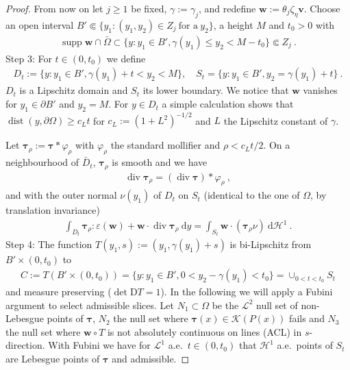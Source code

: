 \documentclass[10pt,a4paper]{amsart}
\newcommand{\K}{\mathcal{K}}
\newcommand{\bftau}{\boldsymbol{\tau}}
\newcommand{\bfv}{\boldsymbol{v}}
\newcommand{\bfw}{\boldsymbol{w}}
\newcommand{\dd}{\:\mathrm{d}}
\DeclareMathOperator{\dist}{dist}
\renewcommand\div{\operatorname{\mathrm{div}}}
\DeclareMathOperator{\supp}{supp}
\begin{document}
\begin{proof}
    From now on let $j\geq 1$ be fixed, $\gamma:= \gamma_j$, and redefine $\bfw:= \theta_j\zeta_\eta\bfv$. Choose an open interval $B' \Subset \{y_1:(y_1,y_2)\in Z_j\ \text{for a}\ y_2\}$, a height $M$ and $t_0>0$ with
    \begin{align*}
        \supp \bfw \cap \bar\Omega \subset \{y : y_1\in B', \gamma(y_1)\leq y_2 < M-t_0\} \Subset Z_j \ .
    \end{align*}
    Step 3: For $t \in (0,t_0)$ we define
    \begin{align*}
        D_t := \{y : y_1\in B', \gamma(y_1)+t <y_2<M\}, \quad S_t =\{y : y_1\in B', y_2 = \gamma(y_1)+t\} \ .
    \end{align*}
    $D_t$ is a Lipschitz domain and $S_t$ its lower boundary. We notice that $\bfw$ vanishes for $y_1\in\partial B'$ and $y_2=M$. For $y\in D_t$ a simple calculation shows that $\dist(y,\partial\Omega)\geq c_L t$ for $c_L := (1+L^2)^{-1/2}$ and
    $L$ the Lipschitz constant of $\gamma$.

    Let $\bftau_\rho := \bftau * \varphi_\rho$ with $\varphi_\rho$ the standard mollifier and $\rho < c_L t/2$. On a neighbourhood of $\bar D_t$, $\bftau_\rho$ is
    smooth and we have
     \begin{align*}
        \div \bftau_\rho = (\div\bftau) * \varphi_\rho \ ,
     \end{align*}
     and with the outer normal $\nu(y_1)$ of $D_t$ on $S_t$ (identical to the one of $\Omega$, by
     translation invariance)
     \begin{align}
        \int_{D_t} \bftau_\rho : \varepsilon(\bfw) + \bfw \cdot \div\bftau_\rho \dd y =
        \int_{S_t} \bfw \cdot(\bftau_\rho \nu) \dd \mathcal{H}^1 \ . \label{eq:trans}
     \end{align}
     Step 4:
     The function $T(y_1, s):= (y_1, \gamma(y_1)+s)$ is bi-Lipschitz from $B'\times (0,t_0)$ to
     \begin{align*}
        C := T(B'\times (0,t_0)) = \{y : y_1\in B', 0<y_2-\gamma(y_1)<t_0\} = \cup_{0<t<t_0} S_t
     \end{align*}
     and measure preserving ($\det \mathrm{D}T=1$). In the following we will apply
     a Fubini argument to select admissible slices.
     Let $N_1 \subset \Omega$ be the $\mathcal{L}^2$ null set of non-Lebesgue points of $\bftau$,
     $N_2$ the null set where $\bftau(x)\in \K(P(x))$ fails and $N_3$ the null set where $\bfw \circ T$ is not absolutely continuous on lines (ACL) in $s$-direction. With Fubini we have for $\mathcal{L}^1$ a.e.\ $t\in(0,t_0)$ that $\mathcal{H}^1$ a.e.\ points of $S_t$ are Lebesgue points of $\bftau$ and admissible.


\end{proof}
\end{document}
